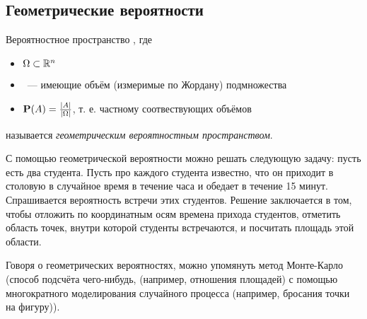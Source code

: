 \begin{example}
\end{example}

\subsection{Геометрические вероятности}

\begin{definition}
Вероятностное пространство \PSP, где
\begin{itemize}
	\item $\Omega \subset \mathbb{R}^n$
	\item \Flg~--- имеющие объём (измеримые по Жордану) подмножества \oO
	\item $\mathbf{P}(A)=\frac{|A|}{|\Omega|}$, т. е. частному соотвествующих объёмов
\end{itemize}
называется {\it геометрическим вероятностным пространством}.
\end{definition}

С помощью геометрической вероятности можно решать следующую задачу: пусть есть два студента. Пусть про каждого студента известно, что он приходит в столовую в случайное время в течение часа и обедает в течение 15 минут. Спрашивается вероятность встречи этих студентов. Решение заключается в том, чтобы отложить по координатным осям времена прихода студентов, отметить область точек, внутри которой студенты встречаются, и посчитать площадь этой области.

Говоря о геометрических вероятностях, можно упомянуть метод Монте-Карло (способ подсчёта чего-нибудь, (например, отношения площадей) с помощью многократного моделирования случайного процесса (например, бросания точки на фигуру)).